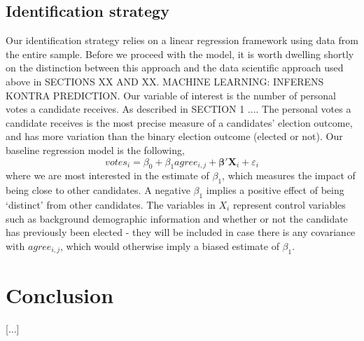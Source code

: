 \subsection{Identification strategy}
Our identification strategy relies on a linear regression framework using data from the entire sample. Before we proceed with the model, it is worth dwelling shortly on the distinction between this approach and the data scientific approach used above in SECTIONS XX AND XX. MACHINE LEARNING: INFERENS KONTRA PREDICTION.
Our variable of interest is the number of personal votes a candidate receives. As described in SECTION 1  .... The personal votes a candidate receives is the most precise measure of a candidates’ election outcome, and has more variation than the binary election outcome (elected or not). Our baseline regression model is the following,
\begin{equation}
votes_{i}=\beta_{0}+\beta_{1}agree_{i,j}+\boldsymbol{\beta}'\mathbf{X}_{i}+\varepsilon_{i}
\end{equation}
where we are most interested in the estimate of $\beta_{1}$, which measures the impact of being close to other candidates. A negative $\beta_{1}$ implies a positive effect of being ‘distinct’ from other candidates. The variables in $X_{i}$ represent control variables such as background demographic information and whether or not the candidate has previously been elected - they will be included in case there is any covariance with $agree_{i,j}$, which would otherwise imply a biased estimate of $\beta_{1}$.

\section{Conclusion}
[...]

